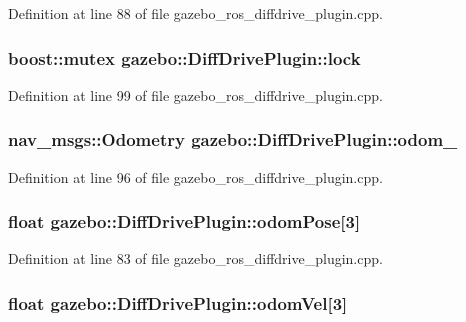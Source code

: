 Definition at line 88 of file gazebo\_\-ros\_\-diffdrive\_\-plugin.cpp.

\subsubsection[{lock}]{\setlength{\rightskip}{0pt plus 5cm}boost::mutex {\bf gazebo::DiffDrivePlugin::lock}\hspace{0.3cm}{\ttfamily  [private]}}\label{classgazebo_1_1DiffDrivePlugin_ac5a7ec6de36b6a125c21fd4c6e023f39}


Definition at line 99 of file gazebo\_\-ros\_\-diffdrive\_\-plugin.cpp.

\subsubsection[{odom\_\-}]{\setlength{\rightskip}{0pt plus 5cm}nav\_\-msgs::Odometry {\bf gazebo::DiffDrivePlugin::odom\_\-}\hspace{0.3cm}{\ttfamily  [private]}}\label{classgazebo_1_1DiffDrivePlugin_ad4887a11cef015833063f0fa057ac74d}


Definition at line 96 of file gazebo\_\-ros\_\-diffdrive\_\-plugin.cpp.

\subsubsection[{odomPose}]{\setlength{\rightskip}{0pt plus 5cm}float {\bf gazebo::DiffDrivePlugin::odomPose}[3]\hspace{0.3cm}{\ttfamily  [private]}}\label{classgazebo_1_1DiffDrivePlugin_a93beaaaa93189aafdd6e4fdb261ecbde}


Definition at line 83 of file gazebo\_\-ros\_\-diffdrive\_\-plugin.cpp.

\subsubsection[{odomVel}]{\setlength{\rightskip}{0pt plus 5cm}float {\bf gazebo::DiffDrivePlugin::odomVel}[3]\hspace{0.3cm}{\ttfamily  [private]}}\label{classgazebo_1_1DiffDrivePlugin_a12d059a2841940a7623f0c17d9013a8b}


